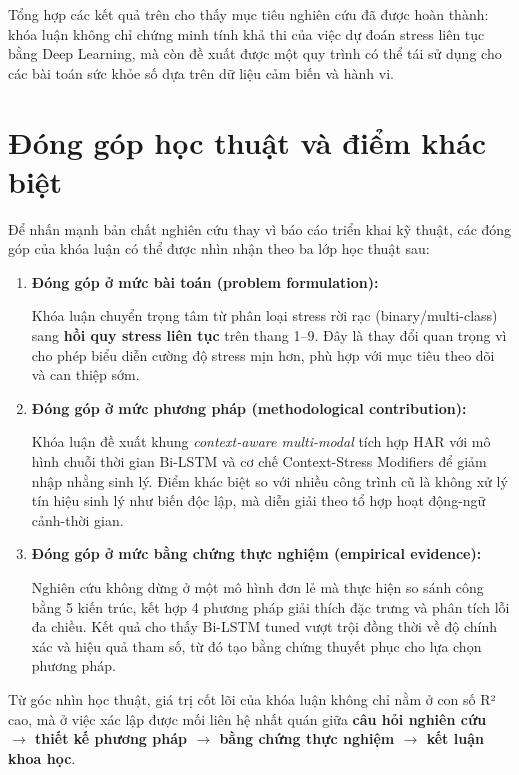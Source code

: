 Tổng hợp các kết quả trên cho thấy mục tiêu nghiên cứu đã được hoàn thành: khóa luận không chỉ chứng minh tính khả thi của việc dự đoán stress liên tục bằng Deep Learning, mà còn đề xuất được một quy trình có thể tái sử dụng cho các bài toán sức khỏe số dựa trên dữ liệu cảm biến và hành vi.

\section{Đóng góp học thuật và điểm khác biệt}
\label{sec:academic_contributions}

Để nhấn mạnh bản chất nghiên cứu thay vì báo cáo triển khai kỹ thuật, các đóng góp của khóa luận có thể được nhìn nhận theo ba lớp học thuật sau:

\begin{enumerate}
    \item \textbf{Đóng góp ở mức bài toán (problem formulation):}
    
    Khóa luận chuyển trọng tâm từ phân loại stress rời rạc (binary/multi-class) sang \textbf{hồi quy stress liên tục} trên thang 1--9. Đây là thay đổi quan trọng vì cho phép biểu diễn cường độ stress mịn hơn, phù hợp với mục tiêu theo dõi và can thiệp sớm.

    \item \textbf{Đóng góp ở mức phương pháp (methodological contribution):}
    
    Khóa luận đề xuất khung \textit{context-aware multi-modal} tích hợp HAR với mô hình chuỗi thời gian Bi-LSTM và cơ chế Context-Stress Modifiers để giảm nhập nhằng sinh lý. Điểm khác biệt so với nhiều công trình cũ là không xử lý tín hiệu sinh lý như biến độc lập, mà diễn giải theo tổ hợp hoạt động-ngữ cảnh-thời gian.

    \item \textbf{Đóng góp ở mức bằng chứng thực nghiệm (empirical evidence):}
    
    Nghiên cứu không dừng ở một mô hình đơn lẻ mà thực hiện so sánh công bằng 5 kiến trúc, kết hợp 4 phương pháp giải thích đặc trưng và phân tích lỗi đa chiều. Kết quả cho thấy Bi-LSTM tuned vượt trội đồng thời về độ chính xác và hiệu quả tham số, từ đó tạo bằng chứng thuyết phục cho lựa chọn phương pháp.
\end{enumerate}

Từ góc nhìn học thuật, giá trị cốt lõi của khóa luận không chỉ nằm ở con số R² cao, mà ở việc xác lập được mối liên hệ nhất quán giữa \textbf{câu hỏi nghiên cứu $\rightarrow$ thiết kế phương pháp $\rightarrow$ bằng chứng thực nghiệm $\rightarrow$ kết luận khoa học}.

